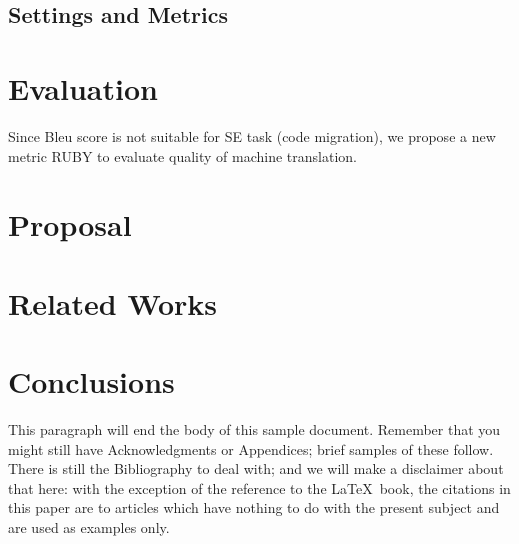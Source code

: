 \subsection{Settings and Metrics}
\section{Evaluation}
Since Bleu score is not suitable for SE task (code migration), we propose a new metric RUBY to evaluate quality of machine translation. 
\section{Proposal}
\section{Related Works}

\section{Conclusions}
This paragraph will end the body of this sample document.
Remember that you might still have Acknowledgments or
Appendices; brief samples of these
follow.  There is still the Bibliography to deal with; and
we will make a disclaimer about that here: with the exception
of the reference to the \LaTeX\ book, the citations in
this paper are to articles which have nothing to
do with the present subject and are used as
examples only.



